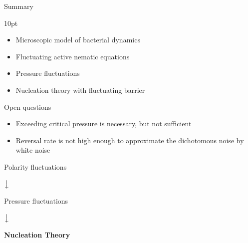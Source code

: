 \documentclass[12pt,aspectratio=169]{beamer}
\begin{document}
\begin{frame}{Summary}
    \onslide<+->
    \begin{wide}{10pt}
    \begin{minipage}[t]{0.5\linewidth}
        
        \vspace{1cm}
        \begin{itemize}
    
        \item Microscopic model of bacterial dynamics
        \item Fluctuating active nematic equations
        \item Pressure fluctuations
        \item Nucleation theory with fluctuating barrier
    \end{itemize}

    \vspace{0.6cm}
    {\large \color{bblue} Open questions}

    \begin{itemize}
        \item Exceeding critical pressure is necessary, but not sufficient
        \item Reversal rate is not high enough to approximate the dichotomous noise by white noise
    \end{itemize}
    \end{minipage}%
    \hfill\onslide<+->
    \begin{minipage}[t]{0.5\linewidth}
        
    {\centering
    
    \color{darkgreen} 

    \vspace{1cm}Polarity fluctuations     
    
    \vspace{0.5cm}
    $\big\downarrow$
    
    \vspace{0.5cm}
    Pressure fluctuations
    
    \vspace{0.5cm}
    $\big\downarrow$
    
    \vspace{0.5cm}
    {
    \textbf{Nucleation Theory}}
    
    \vspace{1cm}
    }
    
    \end{minipage}
    \end{wide}
    \end{frame}
\end{document}
